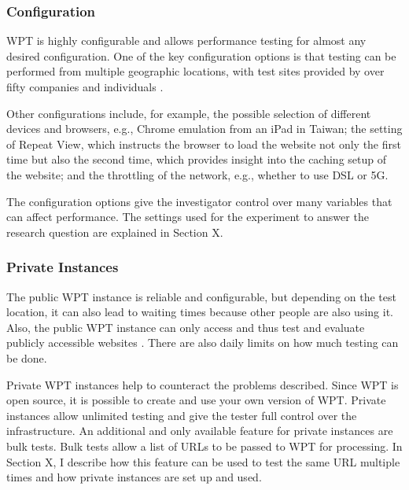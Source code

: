 

\subsubsection{Configuration} %

WPT is highly configurable and allows performance testing for almost any desired configuration.
One of the key configuration options is that testing can be performed from multiple geographic locations, with test sites provided by over fifty companies and individuals \cite{2016Viscomi}.

Other configurations include, for example, the possible selection of different devices and browsers, e.g., Chrome emulation from an iPad in Taiwan; the setting of Repeat View, which instructs the browser to load the website not only the first time but also the second time, which provides insight into the caching setup of the website; and the throttling of the network, e.g., whether to use DSL or 5G.

The configuration options give the investigator control over many variables that can affect performance. 
The settings used for the experiment to answer the research question are explained in Section X.



\subsubsection{Private Instances} %

The public WPT instance is reliable and configurable, but depending on the test location, it can also lead to waiting times because other people are also using it.
Also, the public WPT instance can only access and thus test and evaluate publicly accessible websites \cite{2016Viscomi}.
There are also daily limits on how much testing can be done.

Private WPT instances help to counteract the problems described.
Since WPT is open source, it is possible to create and use your own version of WPT.
Private instances allow unlimited testing and give the tester full control over the infrastructure.
An additional and only available feature for private instances are bulk tests.
Bulk tests allow a list of URLs to be passed to WPT for processing.
In Section X, I describe how this feature can be used to test the same URL multiple times and how private instances are set up and used.

